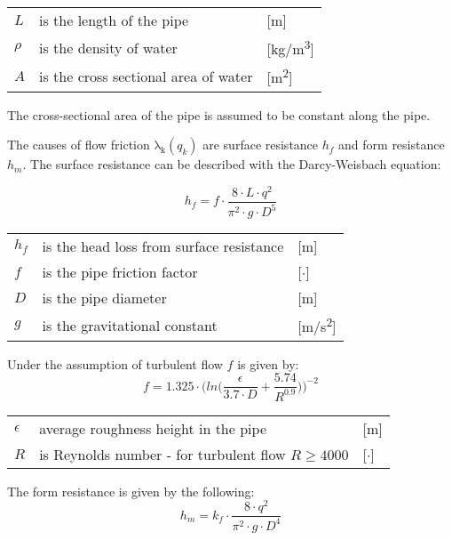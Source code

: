 	\begin{center}
		\begin{tabular}{l p{10cm} l}
			$L$ & is the length of the pipe & [\si{m}]\\
			$\rho$ & is the density of water & [\si{kg}/\si{m\cubed}]\\  
			$A$ & is the cross sectional area of water & [\si{m\squared}]\\ 
		\end{tabular}
	\end{center}
The cross-sectional area of the pipe is assumed to be constant along the pipe.

The causes of flow friction $\mathrm{\lambda_{k}}(q_{k})$ are surface resistance $h_{f}$ and form resistance $h_{m}$. The surface resistance can be described with the Darcy-Weisbach equation:

\begin{equation}
	h_{f} = f \cdot \frac{8\cdot L\cdot q^{2}}{\pi^{2}\cdot g \cdot D^{5}}
\end{equation} 

\begin{center}
	\begin{tabular}{l p{10cm} l}
		$h_{f}$ & is the head loss from surface resistance & [\si{m}]\\
		$f$ & is the pipe friction factor & [$\cdot$]\\
		$D$ & is the pipe diameter & [\si{m}]\\
		$g$ & is the gravitational constant & [\si{m}/\si{s\squared}]\\
	\end{tabular}
\end{center}
Under the assumption of turbulent flow $f$ is given by:
\begin{equation}
	f=1.325\cdot \Bigg(ln\Big(\frac{\epsilon}{3.7 \cdot D}+\frac{5.74}{R^{0.9}}\Big)\Bigg)^{-2}
\end{equation}

\begin{center}
	\begin{tabular}{l p{8cm} l}
		$\epsilon$ & average roughness height in the pipe & [\si{m}]\\
		$R$ &  is Reynolds number - for turbulent ﬂow $R \geq 4000$ & [$\cdot$]\\
	\end{tabular}
\end{center}

The form resistance is given by the following:
\begin{equation}
	h_{m}=k_{f}\cdot \frac{8\cdot q^{2}}{\pi^{2}\cdot g \cdot D^{4}}
\end{equation}

